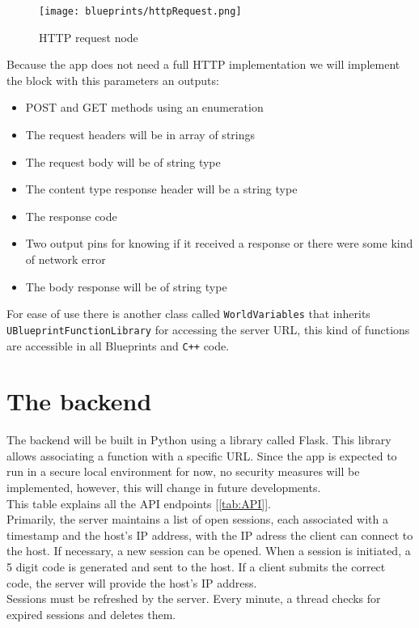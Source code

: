 \begin{figure}[ht]
    \centering
    \texttt{[image: blueprints/httpRequest.png]}
    \caption{HTTP request node}
    \label{fig:HTTPrequest}
\end{figure}
\noindent
Because the app does not need a full \ac{HTTP} implementation we will implement the block with this parameters an outputs:
\begin{itemize}
    \item POST and GET methods using an enumeration
    \item The request headers will be in array of strings
    \item The request body will be of string type
    \item The content type response header will be a string type
    \item The response code
    \item Two output pins for knowing if it received a response or there were some kind of network error
    \item The body response will be of string type
\end{itemize}
\noindent
For ease of use there is another class called \texttt{WorldVariables} that inherits \linebreak\texttt{UBlueprintFunctionLibrary} for accessing the server \ac{URL}, this kind of functions are accessible in all Blueprints and \texttt{C++} code.

\section{The backend}
\noindent
The backend will be built in Python using a library called Flask. This library allows associating a function with a specific \ac{URL}.
Since the app is expected to run in a secure local environment for now, no security measures will be implemented, however, this will change in future developments.\\
This table explains all the \ac{API} endpoints [\ref{tab:API}].\\
Primarily, the server maintains a list of open sessions, each associated with a timestamp and the host's \ac{IP} address, with the \ac{IP} adress the client can connect to the host.
If necessary, a new session can be opened. When a session is initiated, a 5 digit code is generated and sent to the host.
If a client submits the correct code, the server will provide the host's IP address.\\
Sessions must be refreshed by the server. Every minute, a thread checks for expired sessions and deletes them.


